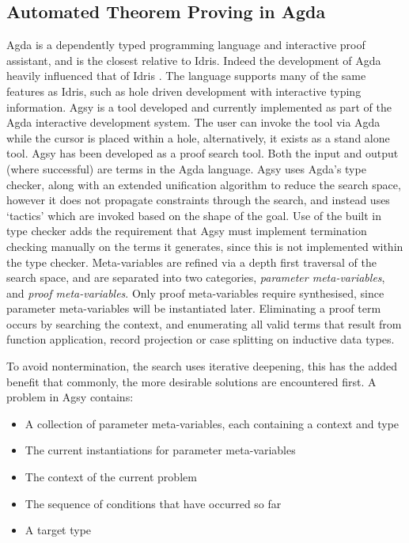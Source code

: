 \documentclass[a4paper]{article}
\begin{document}
\subsection{Automated Theorem Proving in Agda}
\label{sec:orgf401d39}
Agda is a dependently typed programming language and interactive proof assistant, and is the closest relative to Idris.
Indeed the development of Agda heavily influenced that of Idris \cite{Splv'202020Aug} . The language supports many
of the same features as Idris, such as hole driven development with interactive typing information. 
Agsy is a tool developed and currently implemented as part of the Agda interactive development system.
The user can invoke the tool via Agda while the cursor is placed within a hole, alternatively, it exists as a stand alone tool.
Agsy has been developed as a proof search tool.
Both the input and output (where successful) are terms in the Agda language. Agsy uses Agda's type checker,
along with an extended unification algorithm to reduce the search space, however it does not propagate constraints
through the search, and instead uses `tactics' which are invoked based on the shape of the goal. Use of the built in type
checker adds the requirement that Agsy must implement termination checking manually on the terms it generates, since this 
is not implemented within the type checker. Meta-variables are refined via a depth first traversal of the search space, and are separated into 
two categories, \emph{parameter meta-variables}, and \emph{proof meta-variables}. Only proof meta-variables require synthesised, since parameter 
meta-variables will be instantiated later. Eliminating a proof term occurs by searching the context,
and enumerating all valid terms that result from function application, record projection or case splitting on inductive data types.

To avoid nontermination, the search uses iterative deepening, this has the added benefit that commonly, the
more desirable solutions are encountered first. A problem in Agsy contains:
\begin{itemize}
\item A collection of parameter meta-variables, each containing a context and type
\item The current instantiations for parameter meta-variables
\item The context of the current problem
\item The sequence of conditions that have occurred so far
\item A target type
\end{itemize}
\end{document}

